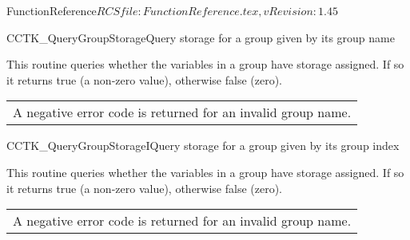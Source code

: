 \begin{cactuspart}{5}{FunctionReference}{$RCSfile: FunctionReference.tex,v $}{$Revision: 1.45 $}


\begin{CCTKFunc}{CCTK\_QueryGroupStorage}{Query storage for a group given by its group name}
\label{CCTK-QueryGroupStorage}
\showargs
\begin{params}
\end{params}
\begin{discussion}
This routine queries whether the variables in a group have storage assigned.
If so it returns true (a non-zero value), otherwise false (zero).
\end{discussion}
\begin{errorcodes}
\begin{tabular}{l}
A negative error code is returned for an invalid group name.
\end{tabular}
\end{errorcodes}
\end{CCTKFunc}


\begin{CCTKFunc}{CCTK\_QueryGroupStorageI}{Query storage for a group given by its group index}
\label{CCTK-QueryGroupStorageI}
\showargs
\begin{params}
\end{params}
\begin{discussion}
This routine queries whether the variables in a group have storage assigned.
If so it returns true (a non-zero value), otherwise false (zero).
\end{discussion}
\begin{errorcodes}
\begin{tabular}{l}
A negative error code is returned for an invalid group name.
\end{tabular}
\end{errorcodes}
\end{CCTKFunc}



\end{cactuspart}
